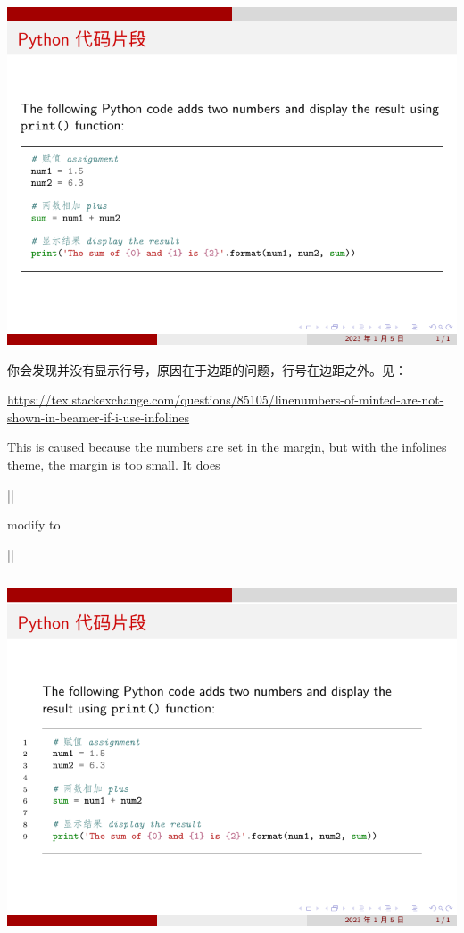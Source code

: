 \includegraphics{examples/beamer/beamercodelisting01.pdf}

你会发现并没有显示行号，原因在于边距的问题，行号在边距之外。见：

\url{https://tex.stackexchange.com/questions/85105/linenumbers-of-minted-are-not-shown-in-beamer-if-i-use-infolines}

This is caused because the numbers are set in the margin, but with the infolines theme, the margin is too small. It does

||

modify to 

||

\inputminted[linenos=true]{latex}{examples/beamer/beamercodelisting02.tex}

\includegraphics{examples/beamer/beamercodelisting02.pdf}

